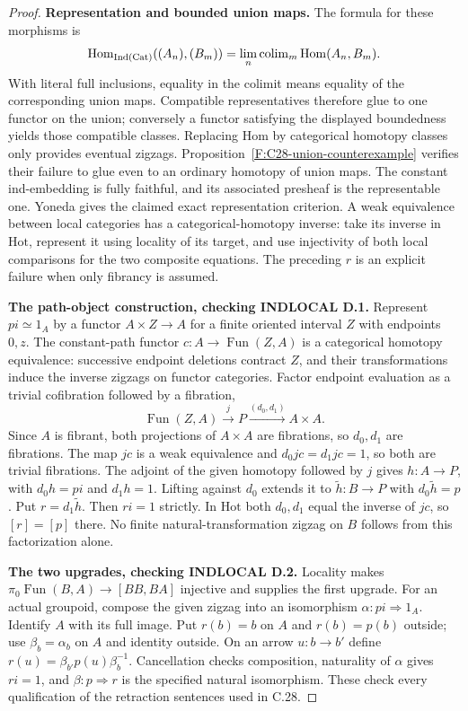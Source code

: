 \begin{proof}
\textbf{Representation and bounded union maps.} The formula for these
morphisms is
\[
 \operatorname{Hom}_{\operatorname{Ind}(\mathrm {Cat})}((A_n),(B_m))
    =\lim_n\operatorname{colim}_m\operatorname{Hom}(A_n,B_m).
\]
With literal full inclusions, equality
in the colimit means equality of the corresponding union maps. Compatible
representatives therefore glue to one functor on the union; conversely
a functor satisfying the displayed boundedness yields those compatible
classes. Replacing Hom by categorical homotopy classes only provides
eventual zigzags. Proposition~\ref{F:C28-union-counterexample} verifies
their failure to glue even to an ordinary homotopy of union maps.
The constant ind-embedding is fully faithful, and its associated
presheaf is the representable one. Yoneda gives the claimed exact
representation criterion. A weak equivalence between local categories
has a categorical-homotopy inverse: take its inverse in $\mathrm{Hot}$,
represent it using locality of its target, and use injectivity of both
local comparisons for the two composite equations. The preceding $r$
is an explicit failure when only fibrancy is assumed.

\textbf{The path-object construction, checking INDLOCAL D.1.}
Represent $pi\simeq1_A$ by a functor $A\times Z\to A$ for a finite
oriented interval $Z$ with endpoints $0,z$. The constant-path functor
$c:A\to\operatorname{Fun}(Z,A)$ is a categorical homotopy equivalence:
successive endpoint deletions contract $Z$, and their transformations
induce the inverse zigzags on functor categories. Factor endpoint
evaluation as a trivial cofibration followed by a fibration,
\[
 \operatorname{Fun}(Z,A)\xrightarrow{j}P
       \xrightarrow{(d_0,d_1)}A\times A.
\]
Since $A$ is fibrant, both projections of $A\times A$ are fibrations,
so $d_0,d_1$ are fibrations. The map $jc$ is a weak equivalence and
$d_0jc=d_1jc=1$, so both are trivial fibrations. The adjoint of the
given homotopy followed by $j$ gives $h:A\to P$, with $d_0h=pi$ and
$d_1h=1$. Lifting against $d_0$ extends it to
$\widetilde h:B\to P$ with $d_0\widetilde h=p$. Put
$r=d_1\widetilde h$. Then $ri=1$ strictly. In $\mathrm{Hot}$ both
$d_0,d_1$ equal the inverse of $jc$, so $[r]=[p]$ there. No finite
natural-transformation zigzag on $B$ follows from this factorization
alone.

\textbf{The two upgrades, checking INDLOCAL D.2.} Locality makes
$\pi_0\operatorname{Fun}(B,A)\to[BB,BA]$ injective and supplies the
first upgrade. For an actual groupoid, compose the given zigzag into
an isomorphism $\alpha:pi\Rightarrow1_A$. Identify $A$ with its full
image. Put $r(b)=b$ on $A$ and $r(b)=p(b)$ outside; use
$\beta_b=\alpha_b$ on $A$ and identity outside. On an arrow $u:b\to b'$
define $r(u)=\beta_{b'}p(u)\beta_b^{-1}$. Cancellation checks composition,
naturality of $\alpha$ gives $ri=1$, and $\beta:p\Rightarrow r$ is the
specified natural isomorphism. These check every qualification of the
retraction sentences used in C.28.
\end{proof}
